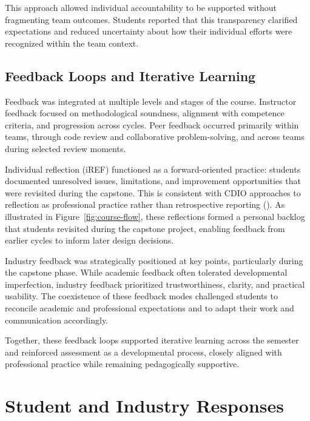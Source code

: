 This approach allowed individual accountability to be supported without fragmenting team outcomes. Students reported that this transparency clarified expectations and reduced uncertainty about how their individual efforts were recognized within the team context.

\subsection{Feedback Loops and Iterative Learning}

Feedback was integrated at multiple levels and stages of the course. Instructor feedback focused on methodological soundness, alignment with competence criteria, and progression across cycles. Peer feedback occurred primarily within teams, through code review and collaborative problem-solving, and across teams during selected review moments.

Individual reflection (iREF) functioned as a forward-oriented practice: students documented unresolved issues, limitations, and improvement opportunities that were revisited during the capstone. This is consistent with CDIO approaches to reflection as professional practice rather than retrospective reporting (\cite{junaid2018logbook}).
As illustrated in Figure~\ref{fig:course-flow}, these reflections formed a personal backlog that students revisited during the capstone project, enabling feedback from earlier cycles to inform later design decisions.

Industry feedback was strategically positioned at key points, particularly during the capstone phase. While academic feedback often tolerated developmental imperfection, industry feedback prioritized trustworthiness, clarity, and practical usability. The coexistence of these feedback modes challenged students to reconcile academic and professional expectations and to adapt their work and communication accordingly.

Together, these feedback loops supported iterative learning across the semester and reinforced assessment as a developmental process, closely aligned with professional practice while remaining pedagogically supportive.

\section{Student and Industry Responses}

